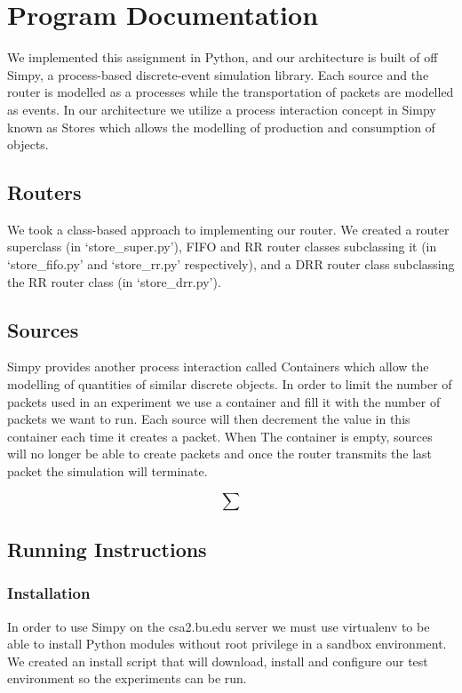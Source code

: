 
\section{Program Documentation}

We implemented this assignment in Python, and our architecture is built of off Simpy, a process-based discrete-event simulation library. Each source and the router is modelled as a processes while the transportation of packets are modelled as events. In our architecture we utilize a process interaction concept in Simpy known as Stores which allows the modelling of production and consumption of objects. 

\subsection{Routers}

We took a class-based approach to implementing our router. 
We created a router superclass (in `store\_super.py'), FIFO and RR router classes subclassing it (in `store\_fifo.py' and `store\_rr.py' respectively), and a DRR router class subclassing the RR router class (in `store\_drr.py').

\subsection{Sources}

Simpy provides another process interaction called Containers which allow the modelling of quantities of similar discrete objects. In order to limit the number of packets used in an experiment we use a container and fill it with the number of packets we want to run. Each source will then decrement the value in this container each time it creates a packet. When The container is empty, sources will no longer be able to create packets and once the router transmits the last packet the simulation will terminate.

\begin{equation}
\sum 
\end{equation}

\subsection{Running Instructions}

\subsubsection{Installation}
In order to use Simpy on the csa2.bu.edu server we must use virtualenv to be able to install Python modules without root privilege in a sandbox environment. We created an install script that will download, install and configure our test environment so the experiments can be run.

